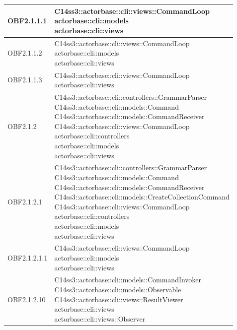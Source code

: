 \documentclass{scalatekids-article}
\begin{document}
\begin{longtable}[H]{|p{4.5cm}|p{13cm}|}
\hline
OBF2.1.1.1 & \multiLineCell[t]{C14ss3::actorbase::cli::views::CommandLoop\\actorbase::cli::models\\actorbase::cli::views\\}\\
\hline
OBF2.1.1.2 & \multiLineCell[t]{C14ss3::actorbase::cli::views::CommandLoop\\actorbase::cli::models\\actorbase::cli::views\\}\\
\hline
OBF2.1.1.3 & \multiLineCell[t]{C14ss3::actorbase::cli::views::CommandLoop\\actorbase::cli::views\\}\\
\hline
OBF2.1.2 & \multiLineCell[t]{C14ss3::actorbase::cli::controllers::GrammarParser\\C14ss3::actorbase::cli::models::Command\\C14ss3::actorbase::cli::models::CommandReceiver\\C14ss3::actorbase::cli::views::CommandLoop\\actorbase::cli::controllers\\actorbase::cli::models\\actorbase::cli::views\\}\\
\hline
OBF2.1.2.1 & \multiLineCell[t]{C14ss3::actorbase::cli::controllers::GrammarParser\\C14ss3::actorbase::cli::models::Command\\C14ss3::actorbase::cli::models::CommandReceiver\\C14ss3::actorbase::cli::models::CreateCollectionCommand\\C14ss3::actorbase::cli::views::CommandLoop\\actorbase::cli::controllers\\actorbase::cli::models\\actorbase::cli::views\\}\\
\hline
OBF2.1.2.1.1 & \multiLineCell[t]{C14ss3::actorbase::cli::views::CommandLoop\\actorbase::cli::models\\actorbase::cli::views\\}\\
\hline
OBF2.1.2.10 & \multiLineCell[t]{C14ss3::actorbase::cli::models::CommandInvoker\\C14ss3::actorbase::cli::models::Observable\\C14ss3::actorbase::cli::views::ResultViewer\\actorbase::cli::views\\actorbase::cli::views::Observer\\}\\

\end{longtable}
\end{document}
